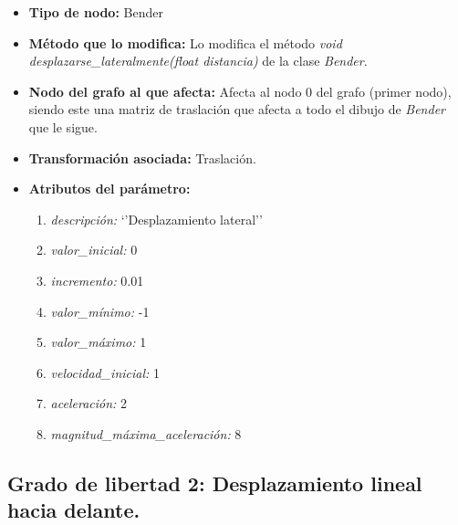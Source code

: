 \documentclass{article}
\begin{document}
	\begin{itemize}
		\item \textbf{Tipo de nodo: } Bender 
		\item \textbf{Método que lo modifica: } Lo modifica el método \textit{void desplazarse\_lateralmente(float distancia)} de la clase \textit{Bender}.
		\item \textbf{Nodo del grafo al que afecta: } Afecta al nodo 0 del grafo (primer nodo), siendo este una matriz de traslación que afecta a todo el dibujo de \textit{Bender} que le sigue.
		\item \textbf{Transformación asociada: } Traslación.
		\item \textbf{Atributos del parámetro: }
		\begin{enumerate}
			\item \textit{descripción: } `'Desplazamiento lateral''
			\item  \textit{valor\_inicial:} 0
			\item \textit{incremento: } 0.01
			\item \textit{valor\_mínimo: } -1
			\item \textit{valor\_máximo: } 1
			\item \textit{velocidad\_inicial: } 1
			\item \textit{aceleración: } 2
			\item \textit{magnitud\_máxima\_aceleración: }  8
		\end{enumerate}
	\end{itemize}


	\subsection{Grado de libertad 2: Desplazamiento lineal hacia delante.}
	
\end{document}
